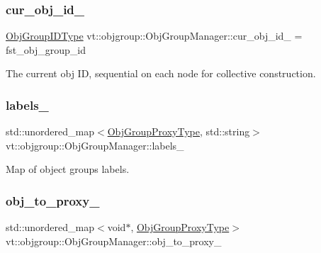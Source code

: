 \subsubsection{\texorpdfstring{cur\+\_\+obj\+\_\+id\+\_\+}{cur\_obj\_id\_}}
{\footnotesize\ttfamily \hyperlink{namespacevt_1_1objgroup_a54a50ff6833bf618e5bedb9a3b6d0e07}{Obj\+Group\+I\+D\+Type} vt\+::objgroup\+::\+Obj\+Group\+Manager\+::cur\+\_\+obj\+\_\+id\+\_\+ = fst\+\_\+obj\+\_\+group\+\_\+id\hspace{0.3cm}{\ttfamily [private]}}



The current obj ID, sequential on each node for collective construction. 

\mbox{\label{structvt_1_1objgroup_1_1_obj_group_manager_a9732b303116ebf05972ba319d79f9ac6}} 
\subsubsection{\texorpdfstring{labels\+\_\+}{labels\_}}
{\footnotesize\ttfamily std\+::unordered\+\_\+map$<$\hyperlink{namespacevt_ad7cae989df485fccca57f0792a880a8e}{Obj\+Group\+Proxy\+Type}, std\+::string$>$ vt\+::objgroup\+::\+Obj\+Group\+Manager\+::labels\+\_\+\hspace{0.3cm}{\ttfamily [private]}}



Map of object groups\textquotesingle{} labels. 

\mbox{\label{structvt_1_1objgroup_1_1_obj_group_manager_a3e20b6ad2329b8e8fa11027320730b42}} 
\subsubsection{\texorpdfstring{obj\+\_\+to\+\_\+proxy\+\_\+}{obj\_to\_proxy\_}}
{\footnotesize\ttfamily std\+::unordered\+\_\+map$<$void$\ast$, \hyperlink{namespacevt_ad7cae989df485fccca57f0792a880a8e}{Obj\+Group\+Proxy\+Type}$>$ vt\+::objgroup\+::\+Obj\+Group\+Manager\+::obj\+\_\+to\+\_\+proxy\+\_\+\hspace{0.3cm}{\ttfamily [private]}}



